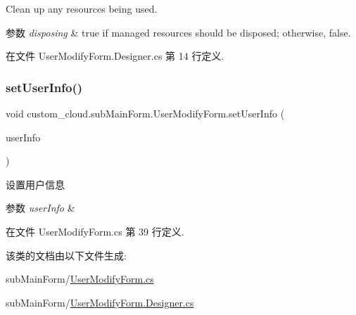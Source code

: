 Clean up any resources being used. 


\begin{DoxyParams}{参数}
{\em disposing} & true if managed resources should be disposed; otherwise, false.\\
\hline
\end{DoxyParams}


在文件 User\+Modify\+Form.\+Designer.\+cs 第 14 行定义.

\mbox{\label{classcustom__cloud_1_1sub_main_form_1_1_user_modify_form_a5bde7223c3602dbe0160604617e9b0e3}} 
\subsubsection{\texorpdfstring{set\+User\+Info()}{setUserInfo()}}
{\footnotesize\ttfamily void custom\+\_\+cloud.\+sub\+Main\+Form.\+User\+Modify\+Form.\+set\+User\+Info (\begin{DoxyParamCaption}\item[{\hyperlink{classcustom__cloud_1_1_user_info}{User\+Info}}]{user\+Info }\end{DoxyParamCaption})}



设置用户信息 


\begin{DoxyParams}{参数}
{\em user\+Info} & \\
\hline
\end{DoxyParams}


在文件 User\+Modify\+Form.\+cs 第 39 行定义.



该类的文档由以下文件生成\+:\begin{DoxyCompactItemize}
\item 
sub\+Main\+Form/\hyperlink{_user_modify_form_8cs}{User\+Modify\+Form.\+cs}\item 
sub\+Main\+Form/\hyperlink{_user_modify_form_8_designer_8cs}{User\+Modify\+Form.\+Designer.\+cs}\end{DoxyCompactItemize}
